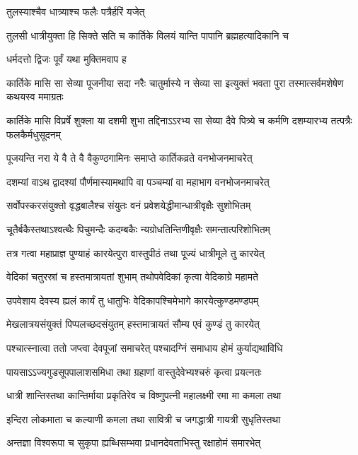 \onelineshloka
{तुलस्याश्चैव धात्र्याश्च फलैः पत्रैर्हरिं यजेत्} %

\twolineshloka
{तुलसी धात्रीयुक्ता हि सिक्ते सति च कार्तिके}
{विलयं यान्ति पापानि ब्रह्महत्यादिकानि च} %


\onelineshloka
{धर्मदत्तो द्विजः पूर्वं यथा मुक्तिमवाप ह} %


\threelineshloka
{कार्तिके मासि सा सेव्या पूजनीया सदा नरैः}
{चातुर्मास्ये न सेव्या सा इत्युक्तं भवता पुरा}
{तस्मात्सर्वमशेषेण कथयस्व ममाग्रतः} %


\threelineshloka
{कार्तिके मासि विप्रर्षे शुक्ला या दशमी शुभा}
{तद्दिनाऽऽरभ्य सा सेव्या दैवे पित्र्ये च कर्मणि}
{दशम्यारभ्य तत्पत्रैः फलकैर्मधुसूदनम्} %

\twolineshloka
{पूजयन्ति नरा ये वै ते वै वैकुण्ठगामिनः}
{समाप्ते कार्तिकव्रते वनभोजनमाचरेत्} %

\twolineshloka
{दशम्यां वाऽथ द्वादश्यां पौर्णमास्यामथापि वा}
{पञ्चम्यां वा महाभाग वनभोजनमाचरेत्} %

\twolineshloka
{सर्वोपस्करसंयुक्तो वृद्धबालैश्च संयुतः}
{वनं प्रवेशयेद्धीमान्धात्रीवृक्षैः सुशोभितम्} %

\twolineshloka
{चूतैर्बकैस्तथाऽश्वत्थैः पिचुमन्दैः कदम्बकैः}
{न्यग्रोधतिन्तिणीवृक्षैः समन्तात्परिशोभितम्} %

\twolineshloka
{तत्र गत्वा महाप्राज्ञ पुण्याहं कारयेत्पुरा}
{वास्तुपीठं तथा पूज्यं धात्रीमूले तु कारयेत्} %

\twolineshloka
{वेदिकां चतुरस्रां च हस्तमात्रायतां शुभाम्}
{तथोपवेदिकां कृत्वा वेदिकाग्रे महामते} %

\twolineshloka
{उपवेशाय देवस्य ह्यलं कार्यं तु धातुभिः}
{वेदिकापश्चिमेभागे कारयेत्कुण्डमण्डपम्} %

\twolineshloka
{मेखलात्रयसंयुक्तं पिप्पलच्छदसंयुतम्}
{हस्तमात्रायतं सौम्य एवं कुण्डं तु कारयेत्} %

\twolineshloka
{पश्चात्स्नात्वा ततो जप्त्वा देवपूजां समाचरेत्}
{पश्चादग्निं समाधाय होमं कुर्याद्यथाविधि} %

\twolineshloka
{पायसाऽऽज्यगुडसूपपालाशसमिधा तथा}
{ग्रहाणां वास्तुदेवेभ्यश्चरुं कृत्वा प्रयत्नतः} %

\twolineshloka
{धात्री शान्तिस्तथा कान्तिर्माया प्रकृतिरेव च}
{विष्णुपत्नी महालक्ष्मी रमा मा कमला तथा} %

\twolineshloka
{इन्दिरा लोकमाता च कल्याणी कमला तथा}
{सावित्री च जगद्धात्री गायत्री सुधृतिस्तथा} %

\twolineshloka
{अन्तज्ञा विश्वरूपा च सुकृपा ह्यब्धिसम्भवा}
{प्रधानदेवताभिस्तु रक्षाहोमं समारभेत्} %


